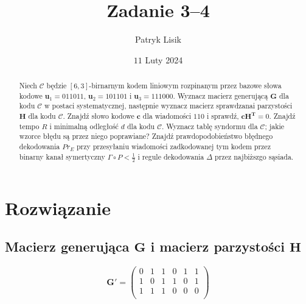 \documentclass[12pt]{article}
\title{Zadanie 3--4}
\author{Patryk Lisik}
\date{\(11\) Luty  2024}
\begin{document}
\maketitle
\renewcommand{\abstractname}{Treść}

\begin{abstract}
    Niech $\mathcal{C}$ będzie $[6,3]$-birnarnym kodem liniowym rozpinanym przez bazowe słowa kodowe
    $\mathbf{u}_1 = 011011$, $\mathbf{u}_2 = 101101$ i $\mathbf{u}_3 = 111000$. Wyznacz macierz generującą $\mathbf{G}$
    dla kodu $\mathcal{C}$ w postaci systematycznej, następnie wyznacz macierz sprawdzanai parzystości $\mathbf{H}$ dla 
    kodu $\mathcal{C}$. Znajdź słowo kodowe $\mathbf{c}$ dla wiadomości $110$ i sprawdź, $\mathbf{cH^T}=0 $. Znajdź tempo
    $R$ i minimalną odległość $d$ dla kodu $\mathcal{C}$. Wyznacz tablę syndormu dla $\mathcal{C}$; jakie wzorce błędu 
    są przez niego poprawiane? Znajdź prawdopodobieństwo błędnego dekodowania $Pr_E$ przy przesyłaniu wiadomości 
    zadkodowanej tym kodem przez binarny kanał symertyczny $\Gamma \circ P < \frac{1}{2} $ i regule dekodowania $\Delta$ 
    przez najbiższgo sąsiada. 

\end{abstract}


\section*{Rozwiązanie}

\subsection*{Macierz generująca $ \mathbf{G} $ i macierz parzystości $\mathbf{H}$ }
$$ \mathbf{G'} = \begin{pmatrix}
    0 & 1 & 1 & 0 & 1 & 1 \\
    1 & 0 & 1 & 1 & 0 & 1 \\
    1 & 1 & 1 & 0 & 0 & 0 \\
\end{pmatrix}
$$ 
\end{document}
